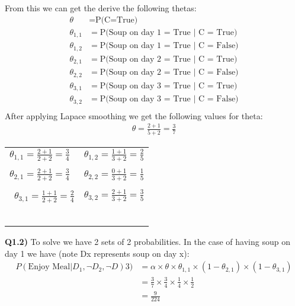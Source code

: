 \documentclass{article}
\begin{document}
\begin{titlepage}
\begin{center}
\begin{tikzpicture}[
  node distance=1cm and 2cm,
  mynode/.style={draw,ellipse,text width=2cm,align=center}]
\end{tikzpicture}
\end{center}
From this we can get the derive the following thetas:
\begin{align*}
\theta &= \text{P(C=True)} \\
\theta_{1,1} &= \text{P(Soup on day 1 = True } |\text{ C = True)} \\
\theta_{1,2} &= \text{P(Soup on day 1 = True } |\text{ C = False)} \\
\theta_{2,1} &= \text{P(Soup on day 2 = True } |\text{ C = True)} \\
\theta_{2,2} &= \text{P(Soup on day 2 = True } |\text{ C = False)} \\
\theta_{3,1} &= \text{P(Soup on day 3 = True } |\text{ C = True)} \\
\theta_{3,2} &= \text{P(Soup on day 3 = True } |\text{ C = False)} \\
\end{align*}
After applying Lapace smoothing we get the following values for theta:
\begin{align*}
\theta = \frac{2+1}{5+2} = \frac{3}{7} 
\end{align*}
\begin{center}
\begin{tabular}{ll}
$\theta_{1,1} = \frac{2 + 1}{2 + 2} = \frac{3}{4}$  & $\theta_{1,2} = \frac{1+1}{3 + 2} = \frac{2}{5}$ \\\\
$\theta_{2,1} = \frac{2 + 1}{2 + 2} = \frac{3}{4}$  & $\theta_{2,2} = \frac{0+1}{3 + 2} = \frac{1}{5}$ \\\\\
$\theta_{3,1} = \frac{1 + 1}{2 + 2} = \frac{2}{4}$  & $\theta_{3,2} = \frac{2+1}{3 + 2} = \frac{3}{5}$ \\\\\
\end{tabular}
\end{center}
\textbf{Q1.2)} To solve we have 2 sets of 2 probabilities. In the case of having soup on day 1 we have (note Dx represents soup on day x):
\begin{align*}
P(\text{Enjoy Meal}  |D_1, \neg D_2, \neg D)3) &= \alpha \times \theta \times \theta_{1,1} \times (1-\theta_{2,1}) \times (1-\theta_{3,1}) \\
&= \frac{3}{7} \times \frac{3}{4} \times \frac{1}{4} \times \frac{1}{2} \\
&= \frac{9}{224}
\end{align*}
\begin{align*}

\end{align*}
\end{titlepage}
\end{document}
